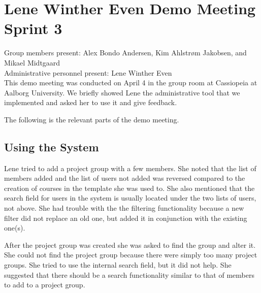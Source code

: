 \section{Lene Winther Even Demo Meeting Sprint 3}
\label{sec:lenedemoone}
Group members present: Alex Bondo Andersen, Kim Ahlstr\o{}m Jakobsen, and Mikael Midtgaard\\
Administrative personnel present: Lene Winther Even\\

This demo meeting was conducted on April 4\ths{} in the group room at Cassiopeia at Aalborg University.
We briefly showed Lene the administrative tool that we implemented and asked her to use it and give feedback.

The following is the relevant parts of the demo meeting.

\subsection*{Using the System}
Lene tried to add a project group with a few members.
She noted that the list of members added and the list of users not added was reversed compared to the creation of courses in the \moodle{} template she was used to.
She also mentioned that the search field for users in the system is usually located under the two lists of users, not above.
She had trouble with the the filtering functionality because a new filter did not replace an old one, but added it in conjunction with the existing one(s).

After the project group was created she was asked to find the group and alter it.
She could not find the project group because there were simply too many project groups.
She tried to use the internal search field, but it did not help.
She suggested that there should be a search functionality similar to that of members to add to a project group.

